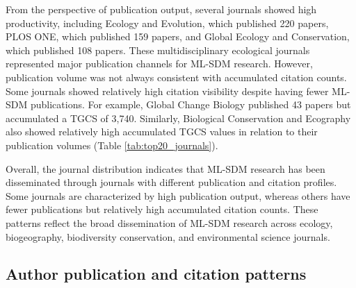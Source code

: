\documentclass[authoryear,preprint,review,12pt]{elsarticle}
\begin{document}
From the perspective of publication output, several journals showed high productivity, including Ecology and Evolution, which published 220 papers, PLOS ONE, which published 159 papers, and Global Ecology and Conservation, which published 108 papers. These multidisciplinary ecological journals represented major publication channels for ML-SDM research. However, publication volume was not always consistent with accumulated citation counts. Some journals showed relatively high citation visibility despite having fewer ML-SDM publications. For example, Global Change Biology published 43 papers but accumulated a TGCS of 3,740. Similarly, Biological Conservation and Ecography also showed relatively high accumulated TGCS values in relation to their publication volumes (Table \ref{tab:top20_journals}).

Overall, the journal distribution indicates that ML-SDM research has been disseminated through journals with different publication and citation profiles. Some journals are characterized by high publication output, whereas others have fewer publications but relatively high accumulated citation counts. These patterns reflect the broad dissemination of ML-SDM research across ecology, biogeography, biodiversity conservation, and environmental science journals.

\subsection{Author publication and citation patterns}
\end{document}

